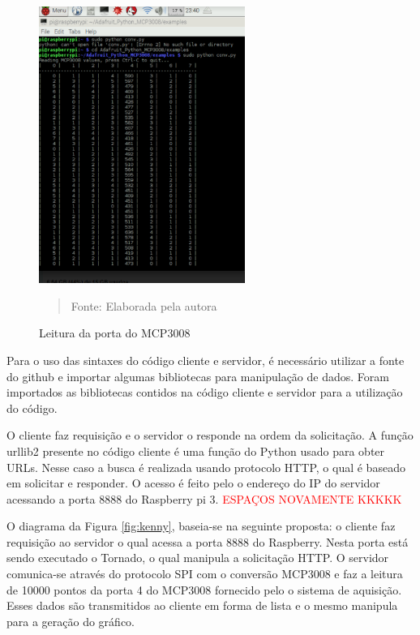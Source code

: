 \documentclass[12pt, a4paper]{article}
\begin{document}
\begin{figure}[H]
\begin{center}
			\caption{Leitura da porta do MCP3008}
			\includegraphics[width=0.6\textwidth]{Figuras/D.PNG}
              \vspace*{\fill} 
            \begin{quote} 
            \centering 
           Fonte: Elaborada pela autora
            \end{quote}
            \vspace*{\fill}
			\label{fig:ciru}
\end{center}
\end{figure}
Para o uso das sintaxes do código cliente e servidor, é necessário utilizar a fonte do github e importar algumas bibliotecas para manipulação de dados. Foram importados as bibliotecas contidos na código cliente e servidor para a utilização do código.

O cliente faz requisição e o servidor o responde na ordem da solicitação. A função urllib2 presente no código cliente  é uma função do Python usado para obter URLs. Nesse caso a busca é realizada usando protocolo 
HTTP, o qual é baseado em solicitar e responder. O acesso é feito pelo o endereço do IP do servidor acessando a porta 8888 do Raspberry pi 3. \textcolor{red}{ESPAÇOS NOVAMENTE KKKKK}

O diagrama da Figura \ref{fig:kenny}, baseia-se na seguinte proposta: o cliente faz requisição ao servidor o qual acessa a porta 8888 do Raspberry. Nesta porta está sendo executado o Tornado, o qual manipula a solicitação HTTP. O servidor comunica-se através do protocolo SPI com o conversão MCP3008 e faz a leitura de 10000 pontos da porta 4 do MCP3008 fornecido pelo o sistema de aquisição. Esses dados são transmitidos ao cliente em forma de lista e o mesmo manipula para a geração do gráfico.
\end{document}
